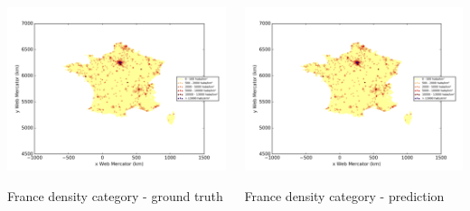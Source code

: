 \documentclass[c]{beamer}
\begin{document}
\begin{frame}
\begin{columns}
 \begin{column}{0.5\textwidth}
  \begin{overlayarea}{\linewidth}{4cm}
    \centering\vfill
    \includegraphics[scale=0.50]{images/France/density_ground_truth.png}
  \end{overlayarea}
  \begin{overlayarea}{\linewidth}{0.5cm}
    \centering
    \tiny France density category - ground truth\par
  \end{overlayarea}
 \end{column}
 \begin{column}{0.5\textwidth}
  \begin{overlayarea}{\linewidth}{4cm}
    \centering\vfill
    \includegraphics[scale=0.50]{images/France/knn/density_classification.png}
  \end{overlayarea}
  \begin{overlayarea}{\linewidth}{0.5cm}
    \centering
    \tiny France density category - prediction\par
  \end{overlayarea}
 \end{column}
\end{columns}


\end{frame}
\end{document}
